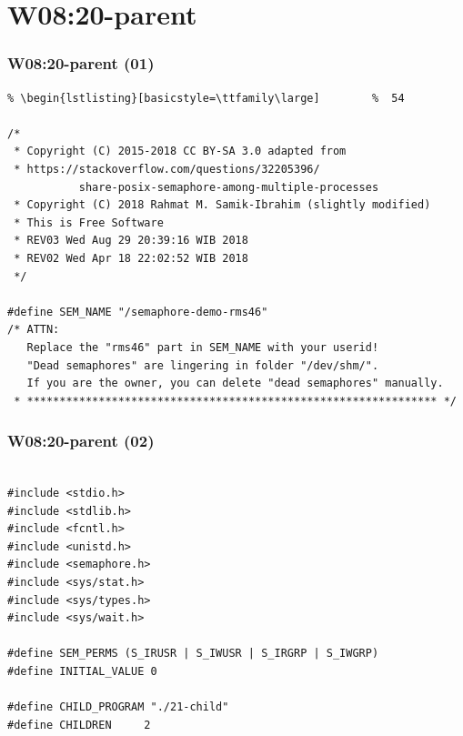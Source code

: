 \documentclass[xcolor=table, notheorems, hyperref={pdfpagelabels=false}]{beamer}
\begin{document}
\section{W08:20-parent}
\begin{frame}[fragile]
\frametitle{W08:20-parent (01)}
\begin{lstlisting}[basicstyle=\ttfamily\footnotesize] %  72
% \begin{lstlisting}[basicstyle=\ttfamily\small]        %  65
% \begin{lstlisting}[basicstyle=\ttfamily\large]        %  54

/*
 * Copyright (C) 2015-2018 CC BY-SA 3.0 adapted from 
 * https://stackoverflow.com/questions/32205396/
           share-posix-semaphore-among-multiple-processes
 * Copyright (C) 2018 Rahmat M. Samik-Ibrahim (slightly modified)
 * This is Free Software
 * REV03 Wed Aug 29 20:39:16 WIB 2018
 * REV02 Wed Apr 18 22:02:52 WIB 2018
 */

#define SEM_NAME "/semaphore-demo-rms46"
/* ATTN:
   Replace the "rms46" part in SEM_NAME with your userid!
   "Dead semaphores" are lingering in folder "/dev/shm/".
   If you are the owner, you can delete "dead semaphores" manually.
 * *************************************************************** */

\end{lstlisting}
\end{frame}

\begin{frame}[fragile]
\frametitle{W08:20-parent (02)}
\begin{lstlisting}[basicstyle=\ttfamily\small]        %  65
% \begin{lstlisting}[basicstyle=\ttfamily\large]        %  54

#include <stdio.h>
#include <stdlib.h>
#include <fcntl.h>
#include <unistd.h>
#include <semaphore.h>
#include <sys/stat.h>
#include <sys/types.h>
#include <sys/wait.h>

#define SEM_PERMS (S_IRUSR | S_IWUSR | S_IRGRP | S_IWGRP)
#define INITIAL_VALUE 0

#define CHILD_PROGRAM "./21-child"
#define CHILDREN     2

\end{lstlisting}
\end{frame}
\end{document}
